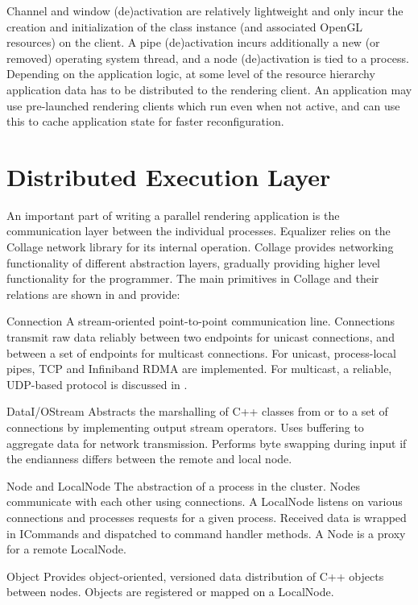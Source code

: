 Channel and window (de)activation are relatively lightweight and only incur the
creation and initialization of the class instance (and associated OpenGL
resources) on the client. A pipe (de)activation incurs additionally a new (or
removed) operating system thread, and a node (de)activation is tied to a
process. Depending on the application logic, at some level of the resource
hierarchy application data has to be distributed to the rendering client. An
application may use pre-launched rendering clients which run even when not
active, and can use this to cache application state for faster reconfiguration.

\section{Distributed Execution Layer}

An important part of writing a parallel rendering application is the
communication layer between the individual processes. \textsf{Equalizer} relies
on the \textsf{Collage} network library for its internal operation.
\textsf{Collage} provides networking functionality of different abstraction
layers, gradually providing higher level functionality for the programmer. The
main primitives in \textsf{Collage} and their relations are shown in
 and provide:

\begin{compactdesc}
\item[Connection] A stream-oriented point-to-point communication
  line. Connections
  transmit raw data reliably between two endpoints for unicast connections, and
  between a set of endpoints for multicast connections. For unicast,
  process-local pipes, TCP and Infiniband RDMA are implemented. For multicast,
  a reliable, UDP-based protocol is discussed in .
\item[DataI/OStream] Abstracts the marshalling of C++ classes from or to
  a set of connections by implementing output stream operators. Uses buffering
  to aggregate data for network transmission. Performs byte swapping during
  input if the endianness differs between the remote and local node.
\item[Node and LocalNode] The abstraction of a process in the cluster. Nodes
  communicate with each other using connections. A LocalNode listens on various
  connections and processes requests for a given process. Received data is
  wrapped in ICommands and dispatched to command handler methods. A Node is a
  proxy for a remote LocalNode.
\item[Object] Provides object-oriented, versioned data distribution of C++
  objects between nodes. Objects are registered or mapped on a Local\-Node.
\end{compactdesc}

